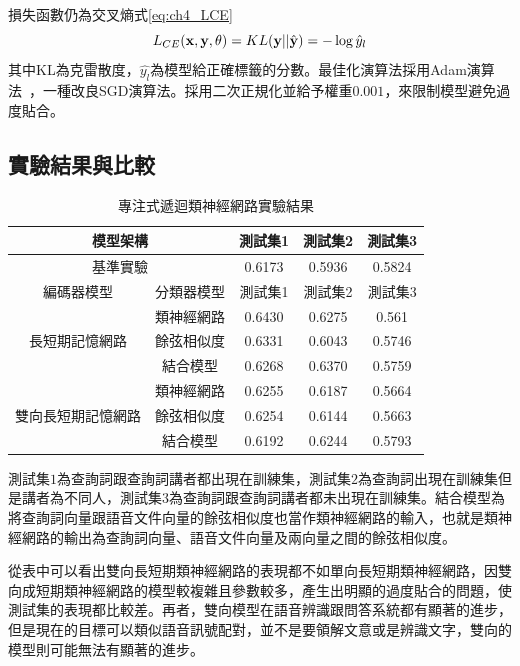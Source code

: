 損失函數仍為交叉熵式\ref{eq:ch4_LCE}
\begin{equation}
\label{eq:ch4_LCE}
L_{CE}(\bold{x} , \bold{y} , \theta) = KL( \bold{y} ||\hat{\bold {y}} )  = - \log \hat{y}_{l} 
\end{equation}
其中KL為克雷散度，$\hat{y_l}$為模型給正確標籤的分數。最佳化演算法採用Adam演算法~\cite{kingma2014adam}，一種改良SGD演算法。採用二次正規化並給予權重$0.001$，來限制模型避免過度貼合。
\subsection{實驗結果與比較}
\begin{table}[ht]
	 \centering
	 \caption{專注式遞迴類神經網路實驗結果}
	 \label{table:ch4_att_exp}
	 \begin{tabular}{|c|c|c|c|c|}
		 \hline
		 \multicolumn{2}{|c|}{模型架構} & 測試集1 & 測試集2 & 測試集3 \\
		 \hline
		 \multicolumn{2}{|c|}{基準實驗} & 0.6173 & 0.5936 & 0.5824\\
		 \hline
		 \hline 
		 編碼器模型 & 分類器模型 & 測試集1 &測試集2 & 測試集3 \\
		 \hline
		 \multirow{3}{*}{長短期記憶網路} & 類神經網路 &
		 {\color{red}0.6430} &0.6275 & 0.561 \\
		 \cline{2-5}
		 & 餘弦相似度& 0.6331 & 0.6043 & 0.5746 \\
		 \cline{2-5}
		 & 結合模型 & 0.6268 & 0.6370 & 0.5759 \\ 
		 \hline
		 \multirow{3}{*}{雙向長短期記憶網路} & 類神經網路 &
		 0.6255 & 0.6187 & 0.5664\\
		 \cline{2-5}
		 & 餘弦相似度& 0.6254 & 0.6144&0.5663\\
		 \cline{2-5}
		 & 結合模型 &0.6192&0.6244&0.5793 \\
		 \hline
	   \end{tabular}
\end{table}

測試集$1$為查詢詞跟查詢詞講者都出現在訓練集，測試集$2$為查詢詞出現在訓練集但是講者為不同人，測試集$3$為查詢詞跟查詢詞講者都未出現在訓練集。結合模型為將查詢詞向量跟語音文件向量的餘弦相似度也當作類神經網路的輸入，也就是類神經網路的輸出為查詢詞向量、語音文件向量及兩向量之間的餘弦相似度。

從表中可以看出雙向長短期類神經網路的表現都不如單向長短期類神經網路，因雙向成短期類神經網路的模型較複雜且參數較多，產生出明顯的過度貼合的問題，使測試集的表現都比較差。再者，雙向模型在語音辨識跟問答系統都有顯著的進步，但是現在的目標可以類似語音訊號配對，並不是要領解文意或是辨識文字，雙向的模型則可能無法有顯著的進步。
\\

